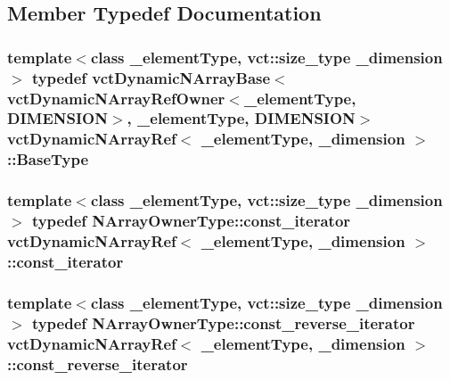 \subsection{Member Typedef Documentation}
\hypertarget{classvct_dynamic_n_array_ref_a05a9add95925f07f6bc955f7623f39d0}{
\subsubsection[{Base\-Type}]{\setlength{\rightskip}{0pt plus 5cm}template$<$class \-\_\-element\-Type, vct\-::size\-\_\-type \-\_\-dimension$>$ typedef {\bf vct\-Dynamic\-N\-Array\-Base}$<${\bf vct\-Dynamic\-N\-Array\-Ref\-Owner}$<$\-\_\-element\-Type, {\bf D\-I\-M\-E\-N\-S\-I\-O\-N}$>$, \-\_\-element\-Type, {\bf D\-I\-M\-E\-N\-S\-I\-O\-N}$>$ {\bf vct\-Dynamic\-N\-Array\-Ref}$<$ \-\_\-element\-Type, \-\_\-dimension $>$\-::{\bf Base\-Type}}}\label{classvct_dynamic_n_array_ref_a05a9add95925f07f6bc955f7623f39d0}
\hypertarget{classvct_dynamic_n_array_ref_adcf4caa9e0d51a28f2baebabecc9a38b}{
\subsubsection[{const\-\_\-iterator}]{\setlength{\rightskip}{0pt plus 5cm}template$<$class \-\_\-element\-Type, vct\-::size\-\_\-type \-\_\-dimension$>$ typedef {\bf N\-Array\-Owner\-Type\-::const\-\_\-iterator} {\bf vct\-Dynamic\-N\-Array\-Ref}$<$ \-\_\-element\-Type, \-\_\-dimension $>$\-::{\bf const\-\_\-iterator}}}\label{classvct_dynamic_n_array_ref_adcf4caa9e0d51a28f2baebabecc9a38b}
\hypertarget{classvct_dynamic_n_array_ref_acbbabce9e90157699716c48667704b2a}{
\subsubsection[{const\-\_\-reverse\-\_\-iterator}]{\setlength{\rightskip}{0pt plus 5cm}template$<$class \-\_\-element\-Type, vct\-::size\-\_\-type \-\_\-dimension$>$ typedef {\bf N\-Array\-Owner\-Type\-::const\-\_\-reverse\-\_\-iterator} {\bf vct\-Dynamic\-N\-Array\-Ref}$<$ \-\_\-element\-Type, \-\_\-dimension $>$\-::{\bf const\-\_\-reverse\-\_\-iterator}}}\label{classvct_dynamic_n_array_ref_acbbabce9e90157699716c48667704b2a}
